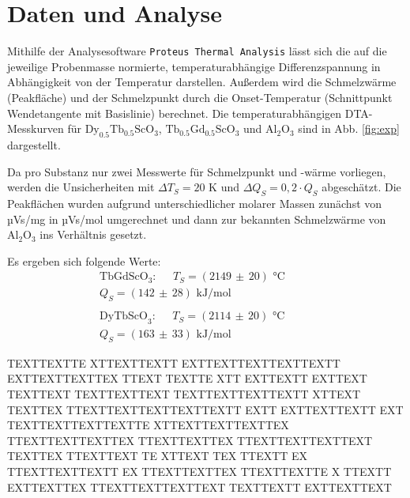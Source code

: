 \documentclass[aps,twocolumn,secnumarabic,nobalancelastpage,amsmath,amssymb,
nofootinbib,superscriptaddress]{revtex4-1}
\begin{document}

\section{Daten und Analyse}
\noindent Mithilfe der Analysesoftware \texttt{Proteus Thermal Analysis} lässt sich die auf die jeweilige Probenmasse normierte, temperaturabhängige Differenzspannung in
Abhängigkeit von der Temperatur darstellen. Außerdem wird die Schmelzwärme (Peakfläche) und der Schmelzpunkt durch die Onset-Temperatur (Schnittpunkt Wendetangente mit Basislinie) \cite{versuchsbeschr}
berechnet. Die temperaturabhängigen DTA-Messkurven für $\text{Dy}_{0.5}\text{Tb}_{0.5}\text{ScO}_3$, $\text{Tb}_{0.5}\text{Gd}_{0.5}\text{ScO}_3$ und $\text{Al}_{2}\text{O}_3$ sind in Abb. \ref{fig:exp} dargestellt.




\noindent Da pro Substanz nur zwei Messwerte für Schmelzpunkt und -wärme vorliegen, werden die Unsicherheiten mit $\Delta T_S=20\text{ K}$ und $\Delta Q_S=0,2\cdot Q_S$ abgeschätzt.
Die Peakflächen wurden aufgrund unterschiedlicher molarer Massen zunächst von µVs/mg in µVs/mol umgerechnet und dann zur bekannten Schmelzwärme von $\text{Al}_2\text{O}_3$ ins Verhältnis gesetzt.

Es ergeben sich folgende Werte:
\begin{eqnarray}
  \text{TbGdScO}_3:\;\;\;\;\; T_S = (2149\,\pm\, 20)\text{ °C}\;\:\,\;\;\;\;\;\:\: \nonumber \\
  Q_S = (142\,\pm\, 28)\text{ kJ/mol}            \;\;\;             \nonumber \\
                                                        \;\;\;               \nonumber \\
  \text{DyTbScO}_3:\;\;\;\;\; T_S = (2114\,\pm\, 20)\text{ °C}\;\:\,\;\;\;\;\;\:\: \nonumber \\
  Q_S = (163\,\pm\, 33)\text{ kJ/mol}                     \;\;\;             \nonumber
  \label{eq:XXX}
\end{eqnarray}

TEXTTEXTTE XTTEXTTEXTT EXTTEXTTEXTTEXTTEXTT EXTTEXTTEXTTEX TTEXT TEXTTE XTT EXTTEXTT EXTTEXT TEXTTEXT TEXTTEXTTEXT TEXTTEXTTEXTTEXTT XTTEXT
TEXTTEX TTEXTTEXTTEXTTEXTTEXTT EXTT EXTTEXTTEXTT EXT TEXTTEXTTEXTTEXTTE XTTEXTTEXTTEXTTEX TTEXTTEXTTEXTTEX TTEXTTEXTTEX TTEXTTEXTTEXTTEXT
TEXTTEX TTEXTTEXT TE XTTEXT TEX TTEXTT EX TTEXTTEXTTEXTT EX TTEXTTEXTTEX TTEXTTEXTTE X TTEXTT EXTTEXTTEX TTEXTTEXTTEXTTEXT TEXTTEXTT EXTTEXTTEXT
\end{document}

